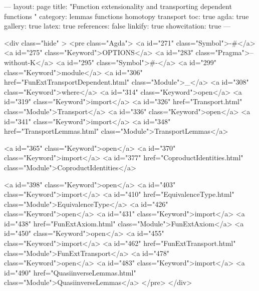 ---
layout: page
title: "Function extensionality and transporting dependent functions "
category: lemmas functions homotopy transport
toc: true
agda: true
gallery: true
latex: true
references: false
linkify: true
showcitation: true
---

<div class="hide" >
<pre class="Agda">
<a id="271" class="Symbol">{-#</a> <a id="275" class="Keyword">OPTIONS</a> <a id="283" class="Pragma">--without-K</a> <a id="295" class="Symbol">#-}</a>
<a id="299" class="Keyword">module</a> <a id="306" href="FunExtTransportDependent.html" class="Module">_</a> <a id="308" class="Keyword">where</a>
<a id="314" class="Keyword">open</a> <a id="319" class="Keyword">import</a> <a id="326" href="Transport.html" class="Module">Transport</a>
<a id="336" class="Keyword">open</a> <a id="341" class="Keyword">import</a> <a id="348" href="TransportLemmas.html" class="Module">TransportLemmas</a>

<a id="365" class="Keyword">open</a> <a id="370" class="Keyword">import</a> <a id="377" href="CoproductIdentities.html" class="Module">CoproductIdentities</a>

<a id="398" class="Keyword">open</a> <a id="403" class="Keyword">import</a> <a id="410" href="EquivalenceType.html" class="Module">EquivalenceType</a>
<a id="426" class="Keyword">open</a> <a id="431" class="Keyword">import</a> <a id="438" href="FunExtAxiom.html" class="Module">FunExtAxiom</a>
<a id="450" class="Keyword">open</a> <a id="455" class="Keyword">import</a> <a id="462" href="FunExtTransport.html" class="Module">FunExtTransport</a>
<a id="478" class="Keyword">open</a> <a id="483" class="Keyword">import</a> <a id="490" href="QuasiinverseLemmas.html" class="Module">QuasiinverseLemmas</a>
</pre>
</div>

